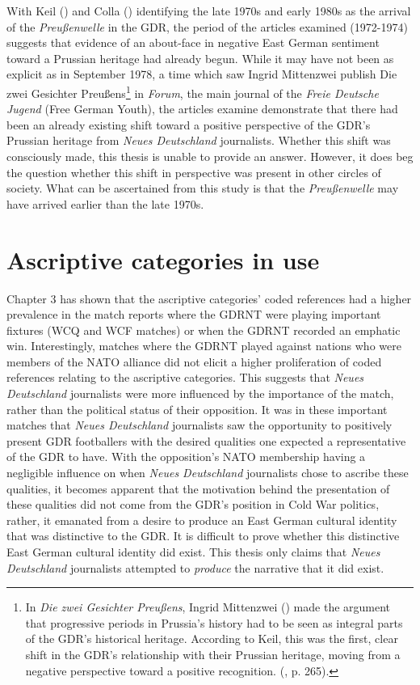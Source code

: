 With Keil (\citeyear{keil2016}) and Colla (\citeyear{colla2019}) identifying the late 1970s and early 1980s as the arrival of the \textit{Preußenwelle} in the GDR, the period of the articles examined (1972-1974) suggests that evidence of an about-face in negative East German sentiment toward a Prussian heritage had already begun. While it may have not been as explicit as in September 1978, a time which saw Ingrid Mittenzwei publish Die zwei Gesichter Preußens\footnote{In \textit{Die zwei Gesichter Preußens}, Ingrid Mittenzwei (\citeyear{mittenzwei1978}) made the argument that progressive periods in Prussia’s history had to be seen as integral parts of the GDR’s historical heritage. According to Keil, this was the first, clear shift in the GDR’s relationship with their Prussian heritage, moving from a negative perspective toward a positive recognition.  (\cite{keil2016}, p. 265).} in \textit{Forum}, the main journal of the \textit{Freie Deutsche Jugend} (Free German Youth), the articles examine demonstrate that there had been an already existing shift toward a positive perspective of the GDR’s Prussian heritage from \textit{Neues Deutschland} journalists. Whether this shift was consciously made, this thesis is unable to provide an answer. However, it does beg the question whether this shift in perspective was present in other circles of society. What can be ascertained from this study is that the \textit{Preußenwelle} may have arrived earlier than the late 1970s.

\section*{Ascriptive categories in use}

Chapter 3 has shown that the ascriptive categories’ coded references had a higher prevalence in the match reports where the GDRNT were playing important fixtures (WCQ and WCF matches) or when the GDRNT recorded an emphatic win. Interestingly, matches where the GDRNT played against nations who were members of the NATO alliance did not elicit a higher proliferation of coded references relating to the ascriptive categories. This suggests that \textit{Neues Deutschland} journalists were more influenced by the importance of the match, rather than the political status of their opposition. It was in these important matches that \textit{Neues Deutschland} journalists saw the opportunity to positively present GDR footballers with the desired qualities one expected a representative of the GDR to have. With the opposition’s NATO membership having a negligible influence on when \textit{Neues Deutschland} journalists chose to ascribe these qualities, it becomes apparent that the motivation behind the presentation of these qualities did not come from the GDR’s position in Cold War politics, rather, it emanated from a desire to produce an East German cultural identity that was distinctive to the GDR. It is difficult to prove whether this distinctive East German cultural identity did exist. This thesis only claims that \textit{Neues Deutschland} journalists attempted to \textit{produce} the narrative that it did exist.

